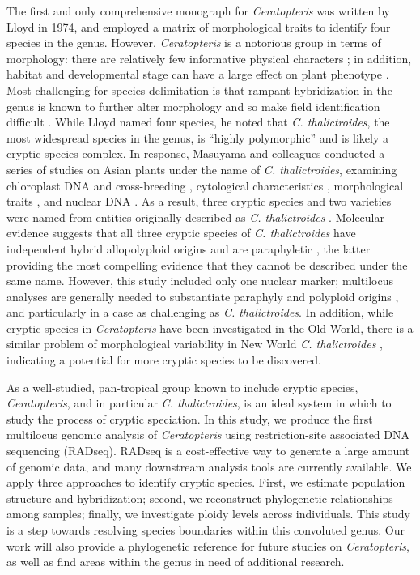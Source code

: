 \documentclass[12pt]{article}
\begin{document}
\begin{flushleft}
The first and only comprehensive monograph for \textit{Ceratopteris} was written by Lloyd in 1974, and employed a matrix of morphological traits to identify four species in the genus\nocite{LloydTax1974}. However, \textit{Ceratopteris} is a notorious group in terms of morphology: there are relatively few informative physical characters \autocite{LloydTax1974}; in addition, habitat and developmental stage can have a large effect on plant phenotype \autocite{Masuyama1992}. Most challenging for species delimitation is that rampant hybridization in the genus is known to further alter morphology and so make field identification difficult \autocite{hickok1974, LloydTax1974, Masuyama2010}. While Lloyd named four species, he noted that \textit{C. thalictroides}, the most widespread species in the genus, is ``highly polymorphic'' \autocite{LloydTax1974} and is likely a cryptic species complex. In response, Masuyama and colleagues conducted a series of studies on Asian plants under the name of \textit{C. thalictroides}, examining chloroplast DNA and cross-breeding \autocite{Masuyama2002}, cytological characteristics \autocite{Masuyama2005}, morphological traits \autocite{Masuyama1992, Masuyama2008}, and nuclear DNA \autocite{Adjie2007}. As a result, three cryptic species and two varieties were named from entities originally described as \textit{C. thalictroides} \autocite{Masuyama2010}. Molecular evidence suggests that all three cryptic species of \textit{C. thalictroides} have independent hybrid allopolyploid origins and are paraphyletic \autocite{Adjie2007}, the latter providing the most compelling evidence that they cannot be described under the same name. However, this study included only one nuclear marker; multilocus analyses are generally needed to substantiate paraphyly and polyploid origins \autocite{Eaton2013, Jorgensen2017}, and particularly in a case as challenging as \textit{C. thalictroides}. In addition, while cryptic species in \textit{Ceratopteris} have been investigated in the Old World, there is a similar problem of morphological variability in New World \textit{C. thalictroides} \autocite{Masuyama2010, LloydTax1974}, indicating a potential for more cryptic species to be discovered.

As a well-studied, pan-tropical group known to include cryptic species, \textit{Ceratopteris}, and in particular \textit{C. thalictroides}, is an ideal system in which to study the process of cryptic speciation. In this study, we produce the first multilocus genomic analysis of \textit{Ceratopteris} using restriction-site associated DNA sequencing (RADseq). RADseq is a cost-effective way to generate a large amount of genomic data, and many downstream analysis tools are currently available. We apply three approaches to identify cryptic species. First, we estimate population structure and hybridization; second, we reconstruct phylogenetic relationships among samples; finally, we investigate ploidy levels across individuals. This study is a step towards resolving species boundaries within this convoluted genus. Our work will also provide a phylogenetic reference for future studies on \textit{Ceratopteris}, as well as find areas within the genus in need of additional research.


\end{flushleft}
\end{document}
